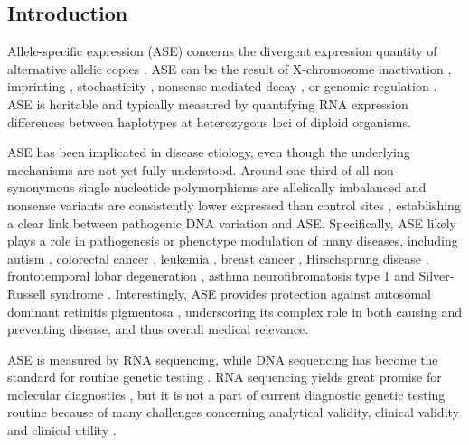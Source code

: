 \documentclass{book}
\begin{document}
\begin{refsection}
\newpage
\section*{Introduction}

Allele-specific expression (ASE) concerns the divergent expression quantity of alternative allelic copies \cite{Knight2004Allele,Raghupathy2018Hierarchical}.
ASE can be the result of X-chromosome inactivation \cite{Plath2002Xist}, imprinting \cite{Daelemans2010High}, stochasticity \cite{Tang2011Deterministic}, nonsense-mediated decay \cite{Tian2018Genome}, or genomic regulation \cite{Lo2003Allelic}.
ASE is heritable \cite{Yan2002Allelic} and typically measured by quantifying RNA expression differences between haplotypes at heterozygous loci of diploid organisms.

ASE has been implicated in disease etiology, even though the underlying mechanisms are not yet fully understood.
Around one-third of all non-synonymous single nucleotide polymorphisms are allelically imbalanced and nonsense variants are consistently lower expressed than control sites \cite{Kukurba2014Allelic}, establishing a clear link between pathogenic DNA variation and ASE.
Specifically, ASE likely plays a role in pathogenesis or phenotype modulation of many diseases, including autism \cite{Lee2019Profiling}, colorectal cancer \cite{Valle2008Germline}, leukemia \cite{de2009Genetic}, breast cancer \cite{Maia2012Effects}, Hirschsprung disease \cite{Emison2010Differential}, frontotemporal lobar degeneration \cite{Finch2011TMEM106B}, asthma \cite{Berlivet2012Interaction} neurofibromatosis type 1 \cite{Jentarra2011Skewed} and Silver-Russell syndrome \cite{Gicquel2005Epimutation}.
Interestingly, ASE provides protection against autosomal dominant retinitis pigmentosa \cite{Rose2013DominantPRPF31Mutations}, underscoring its complex role in both causing and preventing disease, and thus overall medical relevance.

ASE is measured by RNA sequencing, while DNA sequencing has become the standard for routine genetic testing \cite{Adams2018Next}.
RNA sequencing yields great promise for molecular diagnostics \cite{Saeidian2020Research,Li2018Increasing,Kremer2017Genetic,Hamanaka2019RNA,Volk2017The,Mohammadi2019Genetic}, but it is not a part of current diagnostic genetic testing routine \cite{Marco2019RNA} because of many challenges concerning analytical validity, clinical validity and clinical utility \cite{Byron2016Translating}.


\end{refsection}
\end{document}
